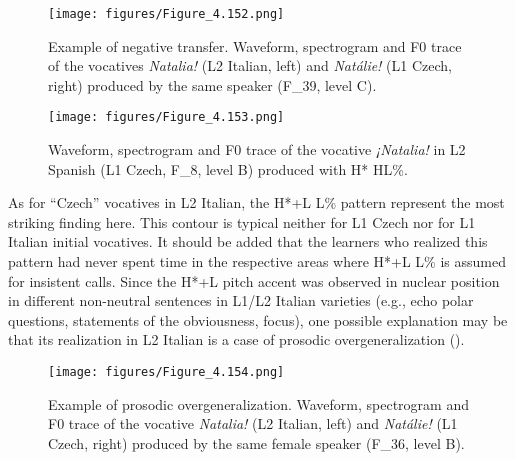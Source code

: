 \begin{figure}

\texttt{[image: figures/Figure\_4.152.png]}



\caption{Example of negative transfer. Waveform, spectrogram and F0 trace of the vocatives \textit{Natalia!} (L2 Italian, left) and \textit{Natálie!} (L1 Czech, right) produced by the same speaker (F\_39, level C).}
\label{fig:4.152}
\end{figure}

\begin{figure}


\texttt{[image: figures/Figure\_4.153.png]}



\caption{Waveform, spectrogram and F0 trace of the vocative \textit{¡Natalia!} in L2 Spanish (L1 Czech, F\_8, level B) produced with H* HL\%.}
\label{fig:4.153}
\end{figure}

As for “Czech” vocatives in L2 Italian, the H*+L L\% pattern represent the most striking finding here. This contour is typical neither for L1 Czech nor for L1 Italian initial vocatives. It should be added that the learners who realized this pattern had never spent time in the respective areas where H*+L L\% is assumed for insistent calls. Since the H*+L pitch accent was observed in nuclear position in different non-neutral sentences in L1/L2 Italian varieties (e.g., echo polar questions, statements of the obviousness, focus), one possible explanation may be that its realization in L2 Italian is a case of prosodic overgeneralization ().

\begin{figure}
\texttt{[image: figures/Figure\_4.154.png]}
\caption{Example of prosodic overgeneralization. Waveform, spectrogram and F0 trace of the vocative \textit{Natalia!} (L2 Italian, left) and \textit{Natálie!} (L1 Czech, right) produced by the same female speaker (\mbox{F\_36}, level B).}
\label{fig:4.154}
\end{figure}


